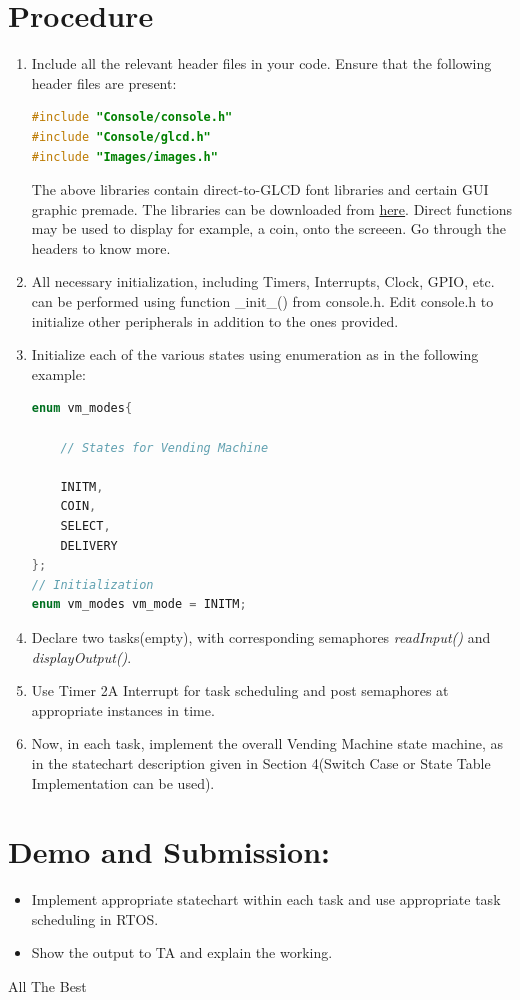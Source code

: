 \documentclass{article}
\begin{document}
\section{Procedure}
\begin{enumerate}
\item \qquad Include all the relevant header files in your code. Ensure that the following header
files are present:
\begin{lstlisting}[basicstyle = \small, language = C]
#include "Console/console.h"
#include "Console/glcd.h"
#include "Images/images.h"
\end{lstlisting}
\qquad The above libraries contain direct-to-GLCD font libraries and certain GUI graphic premade. The libraries can be downloaded from \href{https://github.com/eYSIP-2017/eYSIP-2017_Game_Development-TI-RTOS/blob/master/Documentation/Vending\%20Machine/Vending\%20Machine\%20-\%20Lab\%20Manual/Console\%20Libraries.zip}{here}. Direct functions may be used to display for example, a coin, onto the screeen. Go through the headers to know more.
\item All necessary initialization, including Timers, Interrupts, Clock, GPIO, etc. can be performed using function \_init\_() from console.h. Edit console.h to initialize other peripherals in addition to the ones provided.
\item Initialize each of the various states using enumeration as in the following example:
\begin{lstlisting}[basicstyle = \small, language = C]
enum vm_modes{

    // States for Vending Machine

    INITM,
    COIN,
    SELECT,
    DELIVERY
};
// Initialization
enum vm_modes vm_mode = INITM;
\end{lstlisting}
\item Declare two tasks(empty), with corresponding semaphores \textit{readInput()} and \textit{displayOutput()}.
\item Use Timer 2A Interrupt for task scheduling and post semaphores at appropriate instances in time.
\item Now, in each task, implement the overall Vending Machine state machine, as in the statechart description given in Section 4(Switch Case or State Table Implementation can be used).
\end{enumerate}
\section{Demo and Submission:}
\begin{itemize}
    \item Implement appropriate statechart within each task and use appropriate task scheduling in RTOS.
    \item Show the output to TA and explain the working.
\end{itemize}
\begin{center}
\newline
   All The Best

 \end{center}
\end{document}
